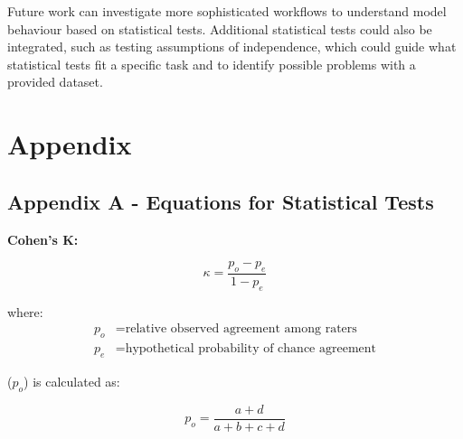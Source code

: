 \documentclass[10.7pt, onecolumn]{article}
\begin{document}
Future work can investigate more sophisticated workflows to understand model behaviour based on statistical tests. Additional statistical tests could also be integrated, such as testing assumptions of independence, which could guide what statistical tests fit a specific task and to identify possible problems with a provided dataset\cite{article2}.



\newpage


\newpage
\section{Appendix}

\subsection{Appendix A - Equations for Statistical Tests}


\textbf{Cohen's K:}

\begin{equation}
  \kappa = \frac{p_o - p_e}{1 - p_e}
  \end{equation}
  
  where:
  \begin{align*}
  p_o & = \text{relative observed agreement among raters} \\
  p_e & = \text{hypothetical probability of chance agreement}
  \end{align*}
  
  ($p_o$) is calculated as:
  
  \begin{equation}
  p_o = \frac{a + d}{a + b + c + d}
  \end{equation}
  
\end{document}
